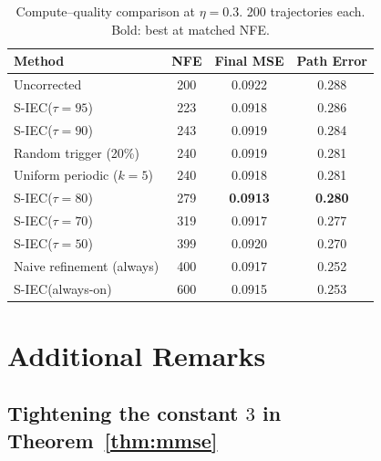 \documentclass{article}
\theoremstyle{plain}
\theoremstyle{definition}
\theoremstyle{remark}
\newcommand{\SIEC}{\texorpdfstring{S\mbox{-}IEC\xspace}{S-IEC }}
\begin{document}
\begin{table}[htbp]
\centering
\caption{Compute--quality comparison at \(\eta=0.3\). 200 trajectories each.
Bold: best at matched NFE.}
\label{tab:pareto}
\small
\begin{tabular}{lccc}
\toprule
\textbf{Method} & \textbf{NFE} & \textbf{Final MSE} & \textbf{Path Error}\\
\midrule
Uncorrected & 200 & 0.0922 & 0.288 \\
\SIEC (\(\tau\!=\!95\)) & 223 & 0.0918 & 0.286 \\
\SIEC (\(\tau\!=\!90\)) & 243 & 0.0919 & 0.284 \\
Random trigger (20\%)   & 240 & 0.0919 & 0.281 \\
Uniform periodic (\(k\!=\!5\)) & 240 & 0.0918 & 0.281 \\
\SIEC (\(\tau\!=\!80\)) & 279 & \textbf{0.0913} & \textbf{0.280} \\
\SIEC (\(\tau\!=\!70\)) & 319 & 0.0917 & 0.277 \\
\SIEC (\(\tau\!=\!50\)) & 399 & 0.0920 & 0.270 \\
Naive refinement (always) & 400 & 0.0917 & 0.252 \\
\SIEC (always-on)       & 600 & 0.0915 & 0.253 \\
\bottomrule
\end{tabular}
\end{table}

\section{Additional Remarks}
\label{app:extra}

\subsection{\texorpdfstring{Tightening the constant $3$ in Theorem~\ref{thm:mmse}}{Tightening the constant 3 in Theorem 6.3}}
\end{document}
